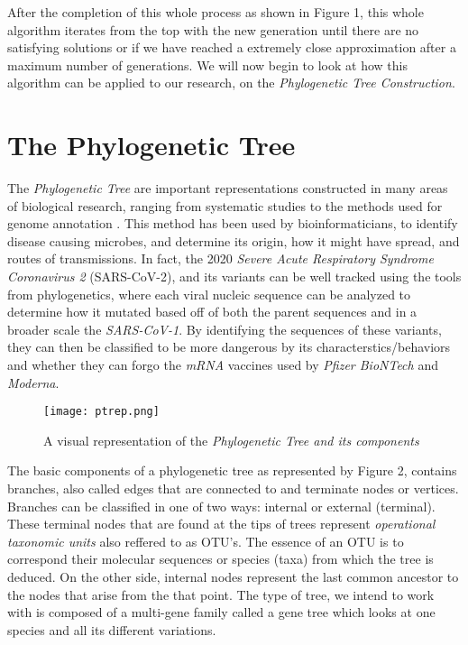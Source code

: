 After the completion of this whole process as shown in Figure 1, this whole algorithm iterates from the top with the new generation until there are no satisfying solutions or if we have reached a extremely close approximation after a maximum number of generations.
We will now begin to look at how this algorithm can be applied to our research, on the \emph{Phylogenetic Tree Construction}. 

\section{The Phylogenetic Tree}

The \emph{Phylogenetic Tree} are important representations constructed in many areas of biological research, ranging from systematic studies to the methods used for genome annotation \cite{Money}. This method has been used by bioinformaticians, to identify disease causing microbes, and determine its origin, how it might have spread, and routes of transmissions. In fact, the 2020 \emph{Severe Acute Respiratory Syndrome Coronavirus 2} (SARS-CoV-2), and its variants can be well tracked using the tools from phylogenetics, where each viral nucleic sequence can be analyzed to determine how it mutated based off of both the parent sequences and in a broader scale the \emph{SARS-CoV-1}. By identifying the sequences of these variants, they can then be classified to be more dangerous by its characterstics/behaviors and whether they can forgo the \emph{mRNA} vaccines used by \emph{Pfizer BioNTech} and \emph{Moderna}. 

\begin{figure}[h]
\centering
\texttt{[image: ptrep.png]}
\caption{A visual representation of the \emph{Phylogenetic Tree and its components} \cite{Gupta}}
\end{figure}

The basic components of a phylogenetic tree as represented by Figure 2, contains branches, also called edges that are connected to and terminate nodes or vertices. Branches can be classified in one of two ways: internal or external (terminal). These terminal nodes that are found at the tips of trees represent \emph{operational taxonomic units} also reffered to as OTU's. The essence of an OTU is to correspond their molecular sequences or species (taxa) from which the tree is deduced. On the other side, internal nodes represent the last common ancestor to the nodes that arise from the that point. The type of tree, we intend to work with is composed of a multi-gene family called a gene tree which looks at one species and all its different variations.

